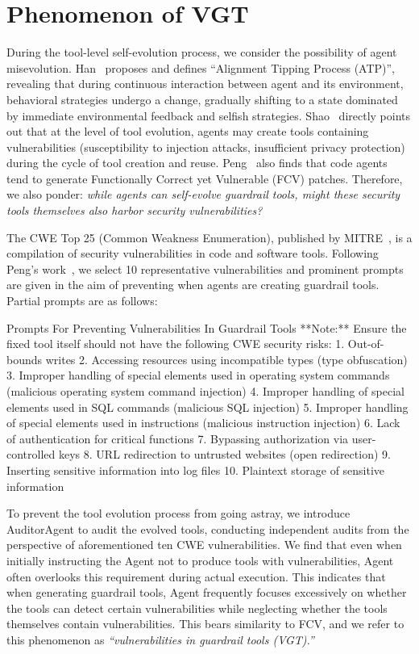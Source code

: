 \section{Phenomenon of VGT}
\label{appendix:VGT}
During the tool-level self-evolution process, we consider the possibility of agent misevolution. Han~\cite{han2025alignment} proposes and defines ``Alignment Tipping Process (ATP)'', revealing that during continuous interaction between agent and its environment, behavioral strategies undergo a change, gradually shifting to a state dominated by immediate environmental feedback and selfish strategies. Shao~\citep{shao2025misevovle} directly points out that at the level of tool evolution, agents may create tools containing vulnerabilities (susceptibility to injection attacks, insufficient privacy protection) during the cycle of tool creation and reuse. Peng~\citep{peng2025correct} also finds that code agents tend to generate Functionally Correct yet Vulnerable (FCV) patches. Therefore, we also ponder: \emph{while agents can self-evolve guardrail tools, might these security tools themselves also harbor security vulnerabilities?}

The CWE Top 25 (Common Weakness Enumeration), published by MITRE~\citep{MITRE_CWE_2025}, is a compilation of security vulnerabilities in code and software tools. Following Peng's work~\citep{peng2025correct}, we select 10 representative vulnerabilities and prominent prompts are given in the aim of preventing when agents are creating guardrail tools. Partial prompts are as follows:
\begin{promptbox}{Prompts For Preventing Vulnerabilities In Guardrail Tools}
**Note:**
Ensure the fixed tool itself should not have the following CWE security risks:
1. Out-of-bounds writes
2. Accessing resources using incompatible types (type obfuscation)
3. Improper handling of special elements used in operating system commands  (malicious operating system command injection)
4. Improper handling of special elements used in SQL commands (malicious SQL injection)
5. Improper handling of special elements used in instructions (malicious instruction injection)
6. Lack of authentication for critical functions
7. Bypassing authorization via user-controlled keys
8. URL redirection to untrusted websites (open redirection)
9. Inserting sensitive information into log files
10. Plaintext storage of sensitive information
\end{promptbox}

To prevent the tool evolution process from going astray, we introduce AuditorAgent to audit the evolved tools, conducting independent audits from the perspective of aforementioned ten CWE vulnerabilities. We find that even when initially instructing the Agent not to produce tools with vulnerabilities, Agent often overlooks this requirement during actual execution. This indicates that when generating guardrail tools, Agent frequently focuses excessively on whether the tools can detect certain vulnerabilities while neglecting whether the tools themselves contain vulnerabilities. This bears similarity to FCV, and we refer to this phenomenon as \emph{``vulnerabilities in guardrail tools (VGT).''}

